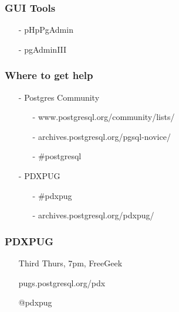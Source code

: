 \documentclass[20pt]{beamer}
\begin{document}
\frame
{
    \frametitle{GUI Tools}
    \begin{itemize}
    \item[-] pHpPgAdmin
    \item[-] pgAdminIII
    \end{itemize}
}



\frame
{
    \frametitle{Where to get help}
    \begin{itemize}
    \item[-] Postgres Community
        \begin{itemize}
        \item[-] www.postgresql.org/community/lists/
        \item[-] archives.postgresql.org/pgsql-novice/
        \item[-] \#postgresql
        \end{itemize}
    \item[-] PDXPUG
        \begin{itemize}
            \item[-] \#pdxpug
            \item[-] archives.postgresql.org/pdxpug/
        \end{itemize}
    \end{itemize}
}

\frame
{
    \frametitle{PDXPUG}
    \begin{itemize}
    \item[] Third Thurs, 7pm, FreeGeek
    \item[] pugs.postgresql.org/pdx
    \item[] @pdxpug
    \end{itemize}
}
\end{document}
